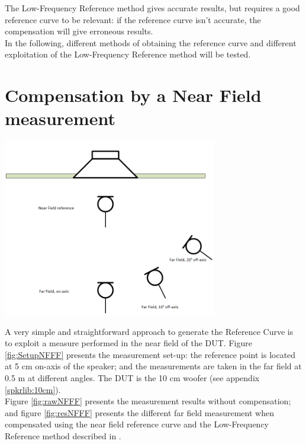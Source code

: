\documentclass{report}
\begin{document}
\vspace{0.2cm}

The Low-Frequency Reference method gives accurate results, but requires a good reference curve to be relevant: if the reference curve isn't accurate, the compensation will give erroneous results. \\
In the following, different methods of obtaining the reference curve and different exploitation of the Low-Frequency Reference method will be tested. 

\section{Compensation by a Near Field measurement}

\begin{minipage}{0.4\textwidth}
\begin{center}
	\includegraphics[width=0.7\textwidth]{RoomComp/NFFF_Setup} 
    \captionsetup{hypcap=false} 
	\label{fig:SetupNFFF}
\end{center}
\end{minipage}
\begin{minipage}{0.6\textwidth}
A very simple and straightforward approach to generate the Reference Curve is to exploit a measure performed in the near field of the DUT. Figure \ref{fig:SetupNFFF} presents the measurement set-up: the reference point is located at 5 cm on-axis of the speaker; and the measurements are taken in the far field at 0.5 m at different angles. The DUT is the 10 cm woofer (see appendix \ref{spkrlib:10cm}). \\

Figure \ref{fig:rawNFFF} presents the measurement results without compensation; and figure \ref{fig:resNFFF} presents the different far field measurement when compensated using the near field reference curve and the Low-Frequency Reference method described in \citep[][sect.~4]{aeswb}. 
\end{minipage}
\end{document}
